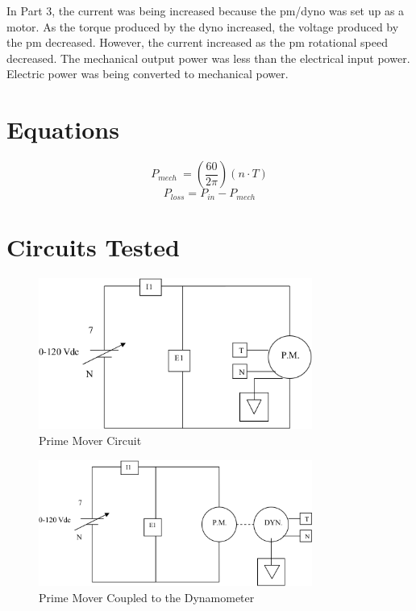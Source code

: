 \documentclass{article}
\begin{document}
In Part 3, the current was being increased because the \gls{pm}/\gls{dyno} was
set up as a motor. As the torque produced by the \gls{dyno} increased, the
voltage produced by the \gls{pm} decreased. However, the current increased as
the \gls{pm} rotational speed decreased. The mechanical output power was less
than the electrical input power.  Electric power was being converted to
mechanical power.

\section*{Equations}

\[P_{mech}\ = \left( \frac{60}{2\pi} \right) (n \cdot T)\]
\[P_{loss} = P_{in} - P_{mech}\]

\section*{Circuits Tested}

\begin{figure}[H]
  \centering
  \includegraphics[width=0.8\textwidth]{img/circuit_01}
  \caption{Prime Mover Circuit}
  \label{fig:circuit_01}
\end{figure}

\begin{figure}[H]
  \centering
  \includegraphics[width=0.8\textwidth]{img/circuit_02}
  \caption{Prime Mover Coupled to the Dynamometer}
  \label{fig:circuit_02}
\end{figure}
\end{document}
